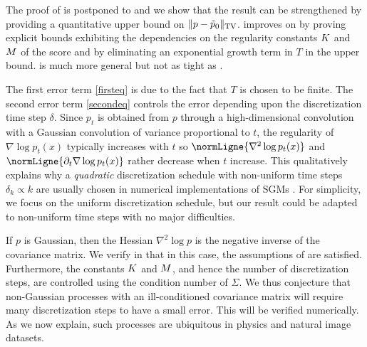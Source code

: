 \documentclass{article}
\begin{document}
The proof of  is postponed to
 and we show that the result can be strengthened by
providing a quantitative upper bound on $\| p - \tilde p_0 \|_{\mathrm{TV}}$.
 improves on \cite[Theorem
1]{debortoli2021diffusion} by proving explicit bounds exhibiting the
dependencies on the regularity constants $K$ and $M$ of the score and by
eliminating an exponential growth term in $T$ in the upper bound.
 is much more general but not as tight as
.  

The first error term \eqref{firsteq} is due to
the fact that $T$ is chosen to be finite. 
The second error term \eqref{secondeq}
controls the error depending upon the discretization time step $\delta$.  Since
$p_t$ is obtained from $p$ through a high-dimensional convolution with a
Gaussian convolution of variance proportional to $t$, the regularity of
$\nabla \log p_t (x)$ typically increases with $t$ so
$\normLigne{\nabla^2 \log p_t(x)}$ and
$\normLigne{\partial_t \nabla \log p_t(x)}$ rather decrease when $t$
increase. This qualitatively explains why a \emph{quadratic} discretization
schedule with non-uniform time steps $\delta_k \propto k$ are usually chosen in numerical
implementations of SGMs \citep{nichol2021improved,song2020improved}.  For
simplicity, we focus on the uniform discretization schedule, but our result could
be adapted to non-uniform time steps with no major difficulties.

If $p$ is Gaussian, then the Hessian $\nabla^2 \log p$ is the negative inverse of the covariance matrix. We verify in  that in this case, the assumptions of   are satisfied. Furthermore, the constants $K$ and $M$, and hence the number of discretization steps, are controlled using the condition number of $\Sigma$. We thus conjecture that  non-Gaussian processes with an ill-conditioned covariance matrix will require many discretization steps to have a small error. This will be verified numerically. As we now explain, such processes are ubiquitous in physics and natural image datasets.
\end{document}
